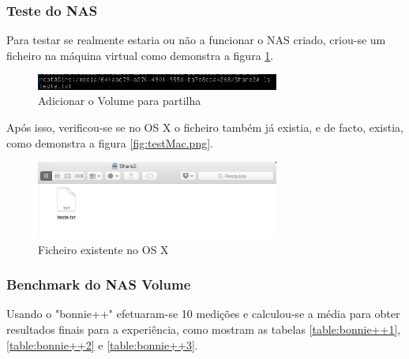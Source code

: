 \documentclass[pdftex,12pt,a4paper]{report}
\begin{document}
\subsubsection{Teste do NAS}

Para testar se realmente estaria ou não a funcionar o NAS criado, criou-se um ficheiro na máquina virtual como demonstra a figura \ref{fig:CreateTestVM}.

\begin{figure}[!htb]
\center
 \includegraphics[width=80mm,scale=1]{imagens/CreateTestVM.png}
 \caption{Adicionar o Volume para partilha}
 \label{fig:CreateTestVM}
\end{figure}

Após isso, verificou-se se no OS X o ficheiro também já existia, e de facto, existia, como demonstra a figura \ref{fig:testMac.png}.

\begin{figure}[!htb]
\center
 \includegraphics[width=80mm,scale=1]{imagens/testMac.png}
 \caption{Ficheiro existente no OS X}
 \label{fig:testMac}
\end{figure}

\subsubsection{Benchmark do NAS Volume}

Usando o "bonnie++" efetuaram-se 10 medições e calculou-se a média para obter resultados finais para a experiência, como mostram as tabelas \ref{table:bonnie++1}, \ref{table:bonnie++2} e \ref{table:bonnie++3}.
\end{document}
